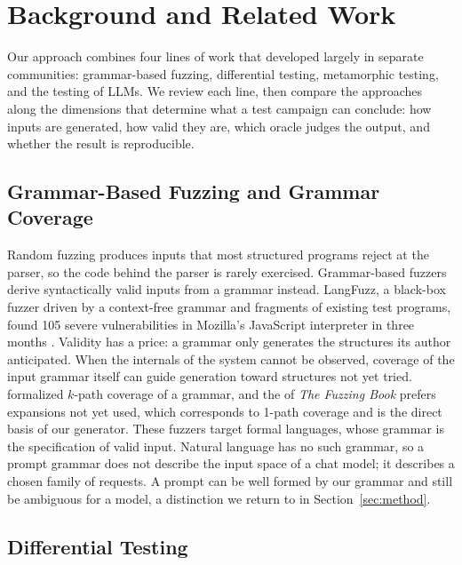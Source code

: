 \section{Background and Related Work}\label{sec:related}

Our approach combines four lines of work that developed largely in separate communities: grammar-based fuzzing, differential testing, metamorphic testing, and the testing of LLMs. We review each line, then compare the approaches along the dimensions that determine what a test campaign can conclude: how inputs are generated, how valid they are, which oracle judges the output, and whether the result is reproducible.

\subsection{Grammar-Based Fuzzing and Grammar Coverage}

Random fuzzing produces inputs that most structured programs reject at the parser, so the code behind the parser is rarely exercised. Grammar-based fuzzers derive syntactically valid inputs from a grammar instead. LangFuzz, a black-box fuzzer driven by a context-free grammar and fragments of existing test programs, found 105 severe vulnerabilities in Mozilla's JavaScript interpreter in three months \citep{holler2012langfuzz}. Validity has a price: a grammar only generates the structures its author anticipated. When the internals of the system cannot be observed, coverage of the input grammar itself can guide generation toward structures not yet tried. \citet{havrikov2019kpath} formalized $k$-path coverage of a grammar, and the  of \emph{The Fuzzing Book} \citep{zeller2024fuzzingbook} prefers expansions not yet used, which corresponds to 1-path coverage and is the direct basis of our generator. These fuzzers target formal languages, whose grammar is the specification of valid input. Natural language has no such grammar, so a prompt grammar does not describe the input space of a chat model; it describes a chosen family of requests. A prompt can be well formed by our grammar and still be ambiguous for a model, a distinction we return to in Section~\ref{sec:method}.

\subsection{Differential Testing}

